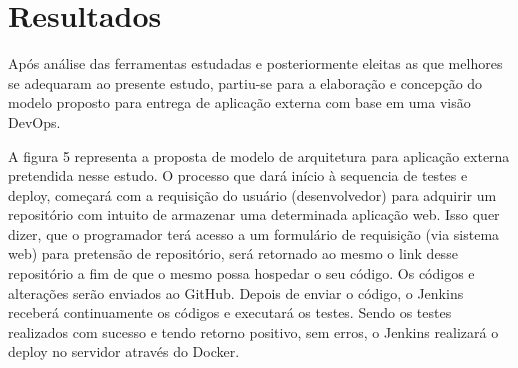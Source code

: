 \chapter{Resultados}\label{cap:resultados}

Após análise das ferramentas estudadas e posteriormente eleitas as que melhores se adequaram ao presente estudo, partiu-se para a elaboração e concepção do modelo proposto para entrega de aplicação externa com base em uma visão DevOps.

A figura 5 representa a proposta de modelo de arquitetura para aplicação externa pretendida nesse estudo. O processo que dará início à sequencia de testes e deploy, começará com a requisição do usuário (desenvolvedor) para adquirir um repositório com intuito de armazenar uma determinada aplicação web. Isso quer dizer, que o programador terá acesso a um formulário de requisição (via sistema web) para pretensão de repositório, será retornado ao mesmo o link desse repositório a fim de que o mesmo possa hospedar o seu código. Os códigos e alterações serão enviados ao GitHub. Depois de enviar o código, o Jenkins receberá continuamente os códigos e executará os testes. Sendo os testes realizados com sucesso e tendo retorno positivo, sem erros, o Jenkins realizará o deploy no servidor através do Docker.




















